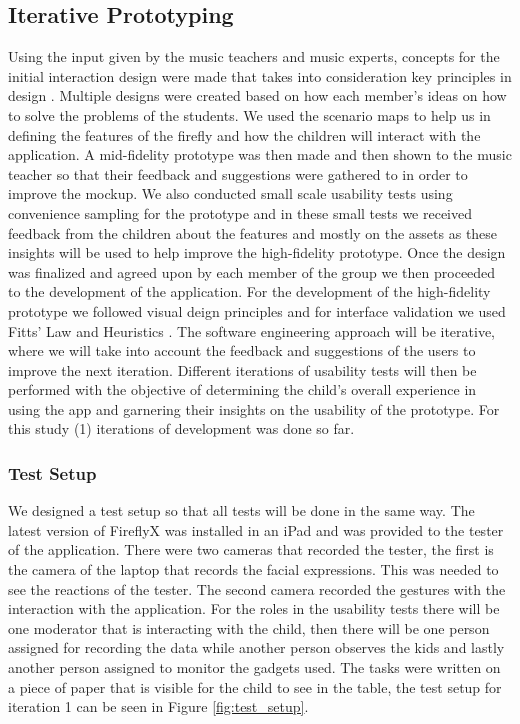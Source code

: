 \subsection{Iterative Prototyping}
Using the input given by the music teachers and music experts, concepts for the initial interaction design were made that takes into consideration key principles in design \cite{williams2015non,stephanidis2012encyclopedia}. Multiple designs were created based on how each member’s ideas on how to solve the problems of the students. We used the scenario maps to help us in defining the features of the firefly and how the children will interact with the application. A mid-fidelity prototype was then made and then shown to the music teacher so that their feedback and suggestions were gathered to in order to improve the mockup. We also conducted small scale usability tests using convenience sampling for the prototype and in these small tests we received feedback from the children about the features and mostly on the assets as these insights will be used to help improve the high-fidelity prototype. Once the design was finalized and agreed upon by each member of the group we then proceeded to the development of the application. For the development of the high-fidelity prototype we followed visual deign principles \cite{yee2002user,chapman_2018} and for interface validation we used Fitts' Law \cite{mackenzie1992fitts} and Heuristics \cite{nielsen1994heuristic}. The software engineering approach will be iterative, where we will take into account the feedback and suggestions of the users to improve the next iteration. Different iterations of usability tests will then be performed with the objective of determining the child's overall experience in using the app and garnering their insights on the usability of the prototype. For this study (1) iterations of development was done so far. 


\subsubsection{Test Setup}
We designed a test setup so that all tests will be done in the same way. The latest version of FireflyX was installed in an iPad and was provided to the tester of the application. There were two cameras that recorded the tester, the first is the camera of the laptop that records the facial expressions. This was needed to see the reactions of the tester. The second camera recorded the gestures with the interaction with the application. For the roles in the usability tests there will be one moderator that is interacting with the child, then there will be one person assigned for recording the data while another person observes the kids and lastly another person assigned to monitor the gadgets used. The tasks were written on a piece of paper that is visible for the child to see in the table, the test setup for iteration 1 can be seen in Figure \ref{fig:test_setup}.
 
